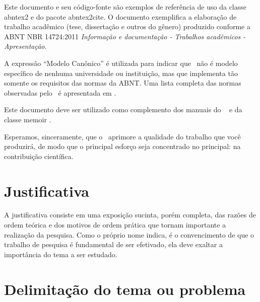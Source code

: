 


Este documento e seu código-fonte são exemplos de referência de uso da classe \textsf{abntex2} e do pacote \textsf{abntex2cite}. O documento exemplifica a elaboração de trabalho acadêmico (tese, dissertação e outros do gênero) produzido conforme a ABNT NBR 14724:2011 \emph{Informação e documentação - Trabalhos acadêmicos - Apresentação}.

A expressão ``Modelo Canônico'' é utilizada para indicar que \abnTeX\ não é modelo específico de nenhuma universidade ou instituição, mas que implementa tão somente os requisitos das normas da ABNT. Uma lista completa das normas observadas pelo \abnTeX\ é apresentada em . 

Este documento deve ser utilizado como complemento dos manuais do \abnTeX\ \cite{abntex2classe,abntex2cite,abntex2cite-alf} e da classe \textsf{memoir} \cite{memoir}. 

Esperamos, sinceramente, que o \abnTeX\ aprimore a qualidade do trabalho que você produzirá, de modo que o principal esforço seja concentrado no principal: na contribuição científica.

\section{Justificativa}

A justificativa consiste em uma exposição sucinta, porém completa, das razões de ordem teórica e dos motivos de ordem prática que tornam importante a realização da pesquisa. Como o próprio nome indica, é o convencimento de que o trabalho de pesquisa é fundamental de ser efetivado, ela deve exaltar a importância do tema a ser estudado.

\section{Delimitação do tema ou problema}

